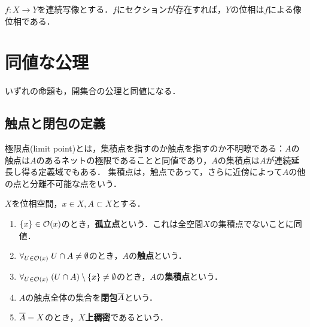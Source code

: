 \documentclass[uplatex,dvipdfmx]{jsreport}
\begin{document}
\begin{proposition}
    $f:X\to Y$を連続写像とする．$f$にセクションが存在すれば，$Y$の位相は$f$による像位相である．
\end{proposition}

\section{同値な公理}

\begin{tcolorbox}[colframe=ForestGreen, colback=ForestGreen!10!white,breakable,colbacktitle=ForestGreen!40!white,coltitle=black,fonttitle=\bfseries\sffamily,
    title=]
    いずれの命題も，開集合の公理と同値になる．
\end{tcolorbox}

\subsection{触点と閉包の定義}

\begin{tcolorbox}[colframe=ForestGreen, colback=ForestGreen!10!white,breakable,colbacktitle=ForestGreen!40!white,coltitle=black,fonttitle=\bfseries\sffamily,
title=]
    極限点(limit point)とは，集積点を指すのか触点を指すのか不明瞭である：$A$の触点は$A$のあるネットの極限であることと同値であり，$A$の集積点は$A$が連続延長し得る定義域でもある．
    集積点は，触点であって，さらに近傍によって$A$の他の点と分離不可能な点をいう．
\end{tcolorbox}

\begin{definition}
    $X$を位相空間，$x\in X,A\subset X$とする．
    \begin{enumerate}
        \item $\{x\}\in\mathcal{O}(x)$のとき，\textbf{孤立点}という．これは全空間$X$の集積点でないことに同値．
        \item $\forall_{U\in\mathcal{O}(x)}\;U\cap A\ne\emptyset$のとき，$A$の\textbf{触点}という．
        \item $\forall_{U\in\mathcal{O}(x)}\;(U\cap A)\setminus\{x\}\ne\emptyset$のとき，$A$の\textbf{集積点}という．
        \item $A$の触点全体の集合を\textbf{閉包}$\overline{A}$という．
        \item $\overline{A}=X$のとき，\textbf{$X$上稠密}であるという．
    \end{enumerate}
\end{definition}
\end{document}
